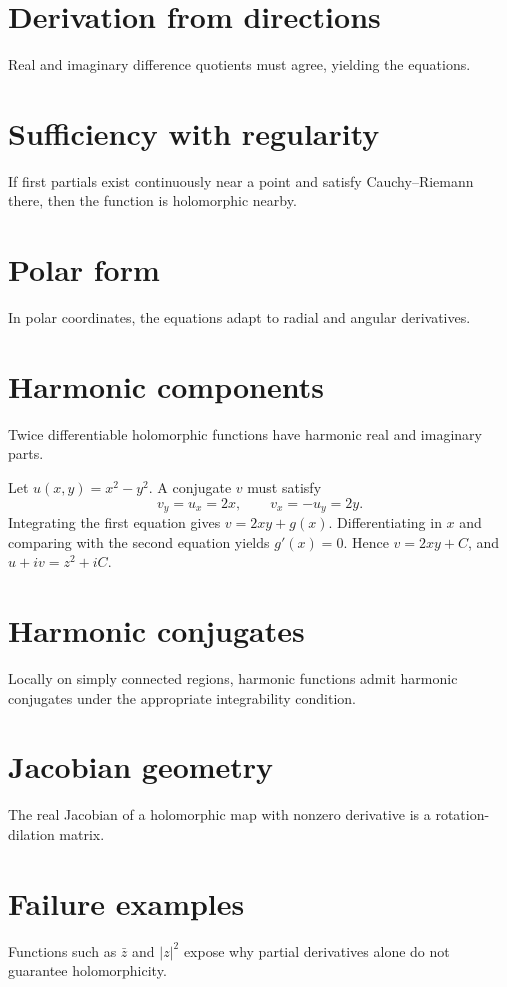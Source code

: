 \section{Derivation from directions}
Real and imaginary difference quotients must agree, yielding the equations.

\section{Sufficiency with regularity}
If first partials exist continuously near a point and satisfy Cauchy–Riemann there, then the function is holomorphic nearby.

\section{Polar form}
In polar coordinates, the equations adapt to radial and angular derivatives.

\section{Harmonic components}
Twice differentiable holomorphic functions have harmonic real and imaginary parts.

\begin{example}\label{ex:iv02-expand-02}
Let \(u(x,y)=x^2-y^2\). A conjugate \(v\) must satisfy
\[
v_y=u_x=2x,\qquad v_x=-u_y=2y.
\]
Integrating the first equation gives \(v=2xy+g(x)\). Differentiating in \(x\) and comparing with the second equation yields \(g'(x)=0\). Hence \(v=2xy+C\), and \(u+iv=z^2+iC\).
\end{example}
\section{Harmonic conjugates}
Locally on simply connected regions, harmonic functions admit harmonic conjugates under the appropriate integrability condition.

\section{Jacobian geometry}
The real Jacobian of a holomorphic map with nonzero derivative is a rotation-dilation matrix.

\section{Failure examples}
Functions such as $\bar z$ and $|z|^2$ expose why partial derivatives alone do not guarantee holomorphicity.

